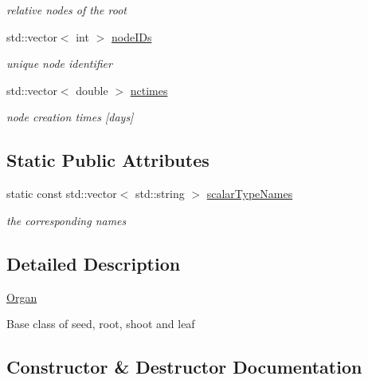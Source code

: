\begin{DoxyCompactItemize}
\begin{DoxyCompactList}\small\item\em relative nodes of the root \end{DoxyCompactList}\item 
\mbox{\label{classCPlantBox_1_1Organ_ab9e80fa3f95812af2ee720719f8457df}} 
std\+::vector$<$ int $>$ \hyperlink{classCPlantBox_1_1Organ_ab9e80fa3f95812af2ee720719f8457df}{node\+I\+Ds}
\begin{DoxyCompactList}\small\item\em unique node identifier \end{DoxyCompactList}\item 
\mbox{\label{classCPlantBox_1_1Organ_a2fad84a9d24de4c66d706510a9c50d09}} 
std\+::vector$<$ double $>$ \hyperlink{classCPlantBox_1_1Organ_a2fad84a9d24de4c66d706510a9c50d09}{nctimes}
\begin{DoxyCompactList}\small\item\em node creation times \mbox{[}days\mbox{]} \end{DoxyCompactList}\end{DoxyCompactItemize}
\subsection*{Static Public Attributes}
\begin{DoxyCompactItemize}
\item 
\mbox{\label{classCPlantBox_1_1Organ_a6df035488e363a748e220eb766c0776d}} 
static const std\+::vector$<$ std\+::string $>$ \hyperlink{classCPlantBox_1_1Organ_a6df035488e363a748e220eb766c0776d}{scalar\+Type\+Names}
\begin{DoxyCompactList}\small\item\em the corresponding names \end{DoxyCompactList}\end{DoxyCompactItemize}


\subsection{Detailed Description}
\hyperlink{classCPlantBox_1_1Organ}{Organ}

Base class of seed, root, shoot and leaf 

\subsection{Constructor \& Destructor Documentation}
\mbox{\label{classCPlantBox_1_1Organ_a7cc5635a2b9a20facab79a78e7a4eb48}} 
